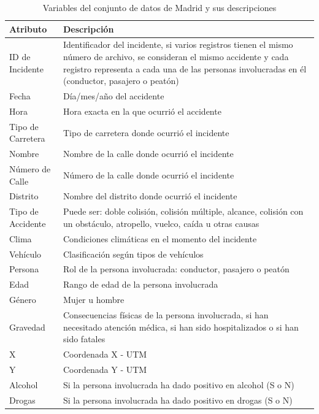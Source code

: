 \begin{table}[ht]
	\caption{Variables del conjunto de datos de Madrid y sus descripciones}
	\begin{center}
		\begin{tabular}{|p{3cm}|p{10cm}|}
			\hline
			\textbf{Atributo} & \textbf{Descripción} \\ \hline \hline
			ID de Incidente  & Identificador del incidente, si varios registros tienen el mismo número de archivo, se consideran el mismo accidente y cada registro representa a cada una de las personas involucradas en él (conductor, pasajero o peatón)  \\ \hline
			Fecha  & Día/mes/año del accidente \\ \hline
			Hora  & Hora exacta en la que ocurrió el accidente \\ \hline
			Tipo de Carretera & Tipo de carretera donde ocurrió el incidente \\ \hline
			Nombre & Nombre de la calle donde ocurrió el incidente \\ \hline
			Número de Calle & Número de la calle donde ocurrió el incidente  \\ \hline
			Distrito & Nombre del distrito donde ocurrió el incidente \\ \hline
			Tipo de Accidente  & Puede ser: doble colisión, colisión múltiple, alcance, colisión con un obstáculo, atropello, vuelco, caída u otras causas \\ \hline
			Clima  & Condiciones climáticas en el momento del incidente \\ \hline
			Vehículo  & Clasificación según tipos de vehículos \\ \hline
			Persona  & Rol de la persona involucrada: conductor, pasajero o peatón \\ \hline
			Edad  & Rango de edad de la persona involucrada \\ \hline
			Género  & Mujer u hombre \\ \hline
			Gravedad & Consecuencias físicas de la persona involucrada, si han necesitado atención médica, si han sido hospitalizados o si han sido fatales \\ \hline
			X   & Coordenada X - UTM \\ \hline
			Y   & Coordenada Y - UTM \\ \hline
			Alcohol & Si la persona involucrada ha dado positivo en alcohol (S o N) \\ \hline
			Drogas & Si la persona involucrada ha dado positivo en drogas (S o N) \\ \hline \hline
		\end{tabular}
	\end{center}

	\label{Datadescription}
\end{table}

